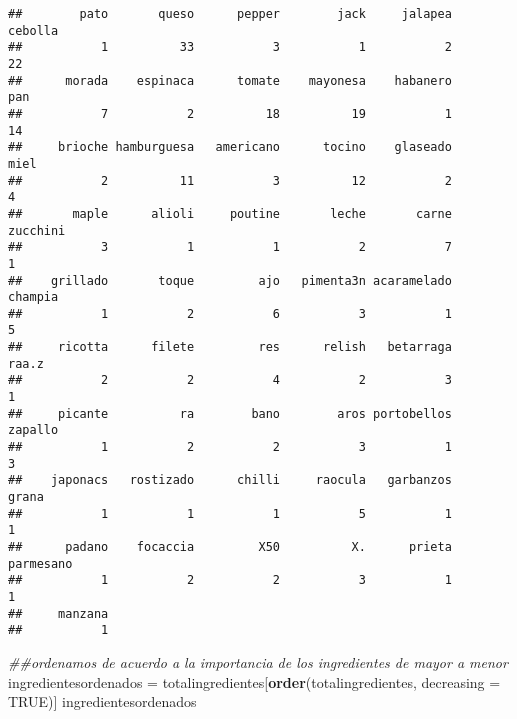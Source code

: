 \documentclass[
]{article}
\newenvironment{Shaded}{\begin{snugshade}}{\end{snugshade}}
\newcommand{\CommentTok}[1]{\textcolor[rgb]{0.56,0.35,0.01}{\textit{#1}}}
\newcommand{\DataTypeTok}[1]{\textcolor[rgb]{0.13,0.29,0.53}{#1}}
\newcommand{\KeywordTok}[1]{\textcolor[rgb]{0.13,0.29,0.53}{\textbf{#1}}}
\newcommand{\NormalTok}[1]{#1}
\newcommand{\OtherTok}[1]{\textcolor[rgb]{0.56,0.35,0.01}{#1}}
\newcommand{\StringTok}[1]{\textcolor[rgb]{0.31,0.60,0.02}{#1}}
\begin{document}
\begin{verbatim}
##        pato       queso      pepper        jack     jalapea     cebolla 
##           1          33           3           1           2          22 
##      morada    espinaca      tomate    mayonesa    habanero         pan 
##           7           2          18          19           1          14 
##     brioche hamburguesa   americano      tocino    glaseado        miel 
##           2          11           3          12           2           4 
##       maple      alioli     poutine       leche       carne    zucchini 
##           3           1           1           2           7           1 
##    grillado       toque         ajo   pimenta3n acaramelado     champia 
##           1           2           6           3           1           5 
##     ricotta      filete         res      relish   betarraga       raa.z 
##           2           2           4           2           3           1 
##     picante          ra        bano        aros portobellos     zapallo 
##           1           2           2           3           1           3 
##    japonacs   rostizado      chilli     raocula   garbanzos       grana 
##           1           1           1           5           1           1 
##      padano    focaccia         X50          X.      prieta   parmesano 
##           1           2           2           3           1           1 
##     manzana 
##           1
\end{verbatim}

\begin{Shaded}
\begin{Highlighting}[]
\CommentTok{##ordenamos de acuerdo a la importancia de los ingredientes de mayor a menor}
\NormalTok{ingredientesordenados =}\StringTok{ }\NormalTok{totalingredientes[}\KeywordTok{order}\NormalTok{(totalingredientes, }\DataTypeTok{decreasing =} \OtherTok{TRUE}\NormalTok{)]}
\NormalTok{ingredientesordenados}
\end{Highlighting}
\end{Shaded}
\end{document}
